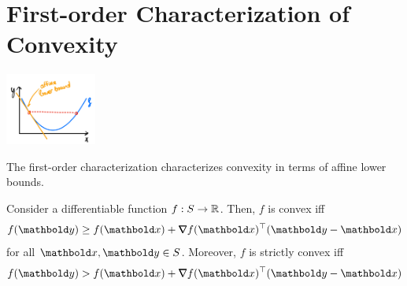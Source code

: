 \section{First-order Characterization of Convexity}

\begin{marginfigure}
\centering\includegraphics[width=3cm]{notes/figures/1st_order_characterization.png}
\caption{The first-order characterization characterizes convexity in terms of affine lower bounds.}
\end{marginfigure}
\begin{thm} Consider a differentiable function $f: S \to \mathbb{R}$. Then, $f$ is convex iff \begin{align}
    f(\vy) \geq f(\vx) + \trans{\grad f(\vx)}(\vy - \vx)
\end{align} for all $\vx, \vy \in \sS$. Moreover, $f$ is strictly convex iff \begin{align}
    f(\vy) > f(\vx) + \trans{\grad f(\vx)}(\vy - \vx)
\end{align}
\end{thm}
